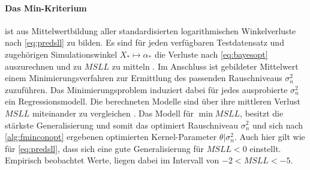 \paragraph*{Das Min-Kriterium} ist aus Mittelwertbildung aller standardisierten logarithmischen Winkelverluste nach \autoref{eq:predsll} zu bilden. Es sind für jeden verfügbaren Testdatensatz und zugehörigen Simulationswinkel $X_* \mapsto \alpha_*$ die Verluste nach \autoref{eq:bayesopt} auszurechnen und zu $MSLL$ zu mitteln \cite{Rasmussen2006}. Im Anschluss ist gebildeter Mittelwert einem Minimierungsverfahren zur Ermittlung des passenden Rauschniveaus $\sigma_n^2$ zuzuführen. Das Minimierungsproblem induziert dabei für jedes ausprobierte $\sigma_n^2$ ein Regressionsmodell. Die berechneten Modelle sind über ihre mittleren Verlust $MSLL$ miteinander zu vergleichen \cite{Rasmussen2006}. Das Modell für $\min MSLL$, besitzt die stärkste Generalisierung und somit das optimiert Rauschniveau $\sigma_n^2$ und sich nach \autoref{alg:fminconopt} ergebenen optimierten Kernel-Parameter $\theta|\sigma_n^2$. Auch hier gilt wie für \autoref{eq:predsll}, dass sich eine gute Generalisierung für $MSLL < 0$ einstellt. Empirisch beobachtet Werte, liegen dabei im Intervall von $-2 < MSLL < -5$.

